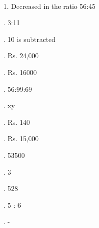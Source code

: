 \documentclass{article}
\begin{document}
\noindent 

\noindent 

\noindent \\   1.   Decreased in the ratio 56:45

\noindent 

.   3:11

\noindent 

.   10 is subtracted

\noindent 

.   Rs. 24,000

\noindent 

.   Rs. 16000

\noindent 

.   56:99:69

\noindent 

.   xy

\noindent 

.   Rs. 140

\noindent 

.   Rs. 15,000

\noindent 

. 53500

\noindent 

. 3

\noindent 

. 528

\noindent 

. 5 : 6

\noindent 

. - 


\noindent 
\end{document}
